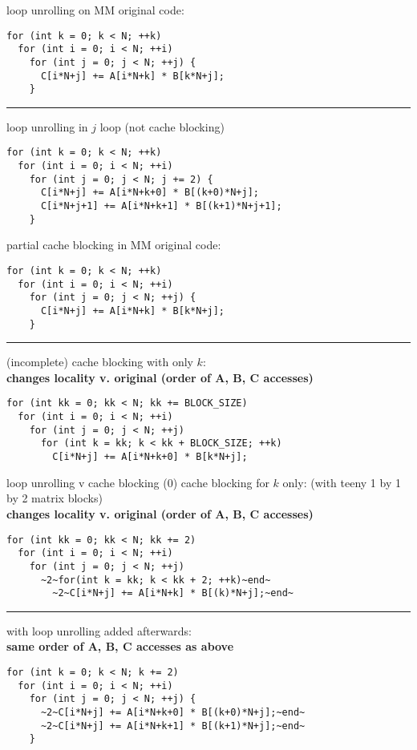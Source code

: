 \begin{frame}[fragile,label=loopUnrollVCacheBlockingIntro1]{loop unrolling on MM}
\lstset{
    style=smaller,language=C
}
original code:
\begin{lstlisting}
for (int k = 0; k < N; ++k) 
  for (int i = 0; i < N; ++i)
    for (int j = 0; j < N; ++j) {
      C[i*N+j] += A[i*N+k] * B[k*N+j];
    }
\end{lstlisting}
\hrule
loop unrolling in $j$ loop (not cache blocking)
\begin{lstlisting}
for (int k = 0; k < N; ++k) 
  for (int i = 0; i < N; ++i)
    for (int j = 0; j < N; j += 2) {
      C[i*N+j] += A[i*N+k+0] * B[(k+0)*N+j];
      C[i*N+j+1] += A[i*N+k+1] * B[(k+1)*N+j+1];
    }
\end{lstlisting}
\end{frame}

\begin{frame}[fragile,label=loopUnrollVCacheBlockingIntro2]{partial cache blocking in MM}
\lstset{
    style=smaller,language=C
}
original code:
\begin{lstlisting}
for (int k = 0; k < N; ++k) 
  for (int i = 0; i < N; ++i)
    for (int j = 0; j < N; ++j) {
      C[i*N+j] += A[i*N+k] * B[k*N+j];
    }
\end{lstlisting}
\hrule
    (incomplete) cache blocking with only $k$: \\
    \textbf{changes locality v. original (order of A, B, C accesses)}
\begin{lstlisting}
for (int kk = 0; kk < N; kk += BLOCK_SIZE) 
  for (int i = 0; i < N; ++i)
    for (int j = 0; j < N; ++j)
      for (int k = kk; k < kk + BLOCK_SIZE; ++k)
        C[i*N+j] += A[i*N+k+0] * B[k*N+j];
\end{lstlisting}
\end{frame}

\begin{frame}[fragile,label=loopUnrollVCacheBlocking0]{loop unrolling v cache blocking (0)}
cache blocking for $k$ only: {\small (with teeny 1 by 1 by 2 matrix blocks)} \\
\textbf{changes locality v. original (order of A, B, C accesses)}
\begin{lstlisting}
for (int kk = 0; kk < N; kk += 2)
  for (int i = 0; i < N; ++i)
    for (int j = 0; j < N; ++j)
      ~2~for(int k = kk; k < kk + 2; ++k)~end~
        ~2~C[i*N+j] += A[i*N+k] * B[(k)*N+j];~end~
\end{lstlisting}
\hrule
with loop unrolling added afterwards: \\
\textbf{same order of A, B, C accesses as above}
\begin{lstlisting}
for (int k = 0; k < N; k += 2)
  for (int i = 0; i < N; ++i)
    for (int j = 0; j < N; ++j) {
      ~2~C[i*N+j] += A[i*N+k+0] * B[(k+0)*N+j];~end~
      ~2~C[i*N+j] += A[i*N+k+1] * B[(k+1)*N+j];~end~
    }
\end{lstlisting}
\end{frame}


